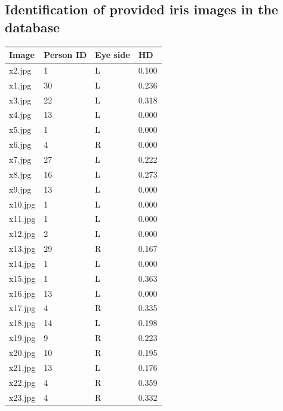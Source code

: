 \documentclass{article}
\begin{document}
\newpage

\subsection{Identification of provided iris images in the database}

\begin{table}[h]
  \centering
  \begin{tabular}{ |p{1.1cm}|p{1.6cm}|p{1.3cm}|p{0.8cm}|  }
    \hline
    Image   & Person ID & Eye side & HD    \\
    \hline                            
    x2.jpg  & 1         & L        & 0.100 \\ 
    x1.jpg  & 30        & L        & 0.236 \\ 
    x3.jpg  & 22        & L        & 0.318 \\ 
    x4.jpg  & 13        & L        & 0.000 \\ 
    x5.jpg  & 1         & L        & 0.000 \\ 
    x6.jpg  & 4         & R        & 0.000 \\ 
    x7.jpg  & 27        & L        & 0.222 \\ 
    x8.jpg  & 16        & L        & 0.273 \\ 
    x9.jpg  & 13        & L        & 0.000 \\ 
    x10.jpg & 1         & L        & 0.000 \\ 
    x11.jpg & 1         & L        & 0.000 \\ 
    x12.jpg & 2         & L        & 0.000 \\ 
    x13.jpg & 29        & R        & 0.167 \\ 
    x14.jpg & 1         & L        & 0.000 \\ 
    x15.jpg & 1         & L        & 0.363 \\ 
    x16.jpg & 13        & L        & 0.000 \\ 
    x17.jpg & 4         & R        & 0.335 \\ 
    x18.jpg & 14        & L        & 0.198 \\ 
    x19.jpg & 9         & R        & 0.223 \\ 
    x20.jpg & 10        & R        & 0.195 \\ 
    x21.jpg & 13        & L        & 0.176 \\ 
    x22.jpg & 4         & R        & 0.359 \\ 
    x23.jpg & 4         & R        & 0.332 \\ 

\end{tabular}
\end{table}
\end{document}
